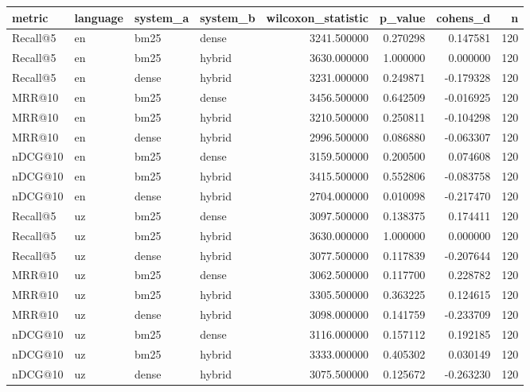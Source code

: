 \begin{tabular}{llllrrrr}
\toprule
metric & language & system_a & system_b & wilcoxon_statistic & p_value & cohens_d & n \\
\midrule
Recall@5 & en & bm25 & dense & 3241.500000 & 0.270298 & 0.147581 & 120 \\
Recall@5 & en & bm25 & hybrid & 3630.000000 & 1.000000 & 0.000000 & 120 \\
Recall@5 & en & dense & hybrid & 3231.000000 & 0.249871 & -0.179328 & 120 \\
MRR@10 & en & bm25 & dense & 3456.500000 & 0.642509 & -0.016925 & 120 \\
MRR@10 & en & bm25 & hybrid & 3210.500000 & 0.250811 & -0.104298 & 120 \\
MRR@10 & en & dense & hybrid & 2996.500000 & 0.086880 & -0.063307 & 120 \\
nDCG@10 & en & bm25 & dense & 3159.500000 & 0.200500 & 0.074608 & 120 \\
nDCG@10 & en & bm25 & hybrid & 3415.500000 & 0.552806 & -0.083758 & 120 \\
nDCG@10 & en & dense & hybrid & 2704.000000 & 0.010098 & -0.217470 & 120 \\
Recall@5 & uz & bm25 & dense & 3097.500000 & 0.138375 & 0.174411 & 120 \\
Recall@5 & uz & bm25 & hybrid & 3630.000000 & 1.000000 & 0.000000 & 120 \\
Recall@5 & uz & dense & hybrid & 3077.500000 & 0.117839 & -0.207644 & 120 \\
MRR@10 & uz & bm25 & dense & 3062.500000 & 0.117700 & 0.228782 & 120 \\
MRR@10 & uz & bm25 & hybrid & 3305.500000 & 0.363225 & 0.124615 & 120 \\
MRR@10 & uz & dense & hybrid & 3098.000000 & 0.141759 & -0.233709 & 120 \\
nDCG@10 & uz & bm25 & dense & 3116.000000 & 0.157112 & 0.192185 & 120 \\
nDCG@10 & uz & bm25 & hybrid & 3333.000000 & 0.405302 & 0.030149 & 120 \\
nDCG@10 & uz & dense & hybrid & 3075.500000 & 0.125672 & -0.263230 & 120 \\
\bottomrule
\end{tabular}
